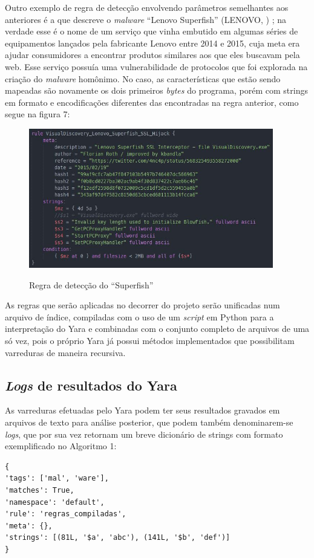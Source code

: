 Outro exemplo de regra de detecção envolvendo parâmetros semelhantes aos
anteriores é a que descreve o \textit{malware} ``Lenovo
Superfish'' (LENOVO, \citeyear{lenovosuperfish}) ; na verdade esse é o nome de um serviço
que vinha embutido em algumas séries de equipamentos lançados pela fabricante
Lenovo entre 2014 e 2015, cuja meta era ajudar consumidores a encontrar produtos
similares aos que eles buscavam pela web. Esse serviço possuía uma
vulnerabilidade de protocolos que foi explorada na criação do \textit{malware}
homônimo. No caso, as características que estão sendo mapeadas são novamente os
dois primeiros \textit{bytes} do programa, porém com strings em formato e
encodificações diferentes das encontradas na regra anterior, como segue na figura 7:

\begin{figure}[H]
	\centering
	\caption{Regra de detecção do ``Superfish''}
	\includegraphics[width=0.95\textwidth]{figs/superfish}
	\label{f.superfish}
\end{figure}

As regras que serão aplicadas no decorrer do projeto serão unificadas num arquivo
de índice, compiladas com o uso de um \textit{script} em Python para a
interpretação do Yara e combinadas com o conjunto completo de arquivos de uma só
vez, pois o próprio Yara já possui métodos implementados que possibilitam
varreduras de maneira recursiva.

\subsection{\textit{Logs} de resultados do Yara} %
\label{sub:logs_de_resultados_do_yara}

As varreduras efetuadas pelo Yara podem ter seus resultados gravados em arquivos
de texto para análise posterior, que podem também denominarem-se
\textit{logs}, que por sua vez retornam um  breve dicionário de strings com formato exemplificado no Algoritmo 1:
\renewcommand{\thelstlisting}{\arabic{lstlisting}}
\begin{lstlisting}[caption=Conteúdo dos arquivos de resultado de varredura, label=resultyara]
{
'tags': ['mal', 'ware'],
'matches': True,
'namespace': 'default',
'rule': 'regras_compiladas',
'meta': {},
'strings': [(81L, '$a', 'abc'), (141L, '$b', 'def')]
}
\end{lstlisting}

